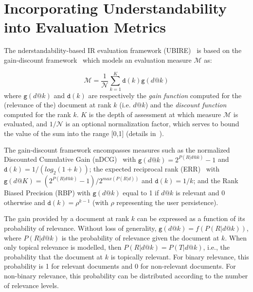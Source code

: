 \section{Incorporating Understandability into Evaluation Metrics}
\label{sec:understandability_metrics}
The nderstandability-based IR evaluation framework (UBIRE)~\cite{zuccon14,zuccon16} is based on the gain-discount framework~\cite{carterette11} which models an evaluation measure $\mathcal{M}$ as:




%
\begin{equation}
\mathcal{M} = \frac{1}{\mathcal{N}} \sum_{k=1}^{K} \mathtt{d}(k) \mathtt{g}(d@k)
\end{equation}
%
where $\mathtt{g}(d@k)$ and $\mathtt{d}(k)$ are respectively the \textit{gain function} computed for the (relevance of the) document at rank $k$ (i.e. $d@k$) and the \textit{discount function} computed for the rank $k$.
$K$ is the depth of assessment at which measure $\mathcal{M}$ is evaluated, and $1/\mathcal{N}$ is an optional normalization factor, which serves to bound the value of the sum into the range [0,1] (details in~\cite{carterette11}).

The gain-discount framework encompasses measures such as the normalized Discounted Cumulative Gain (nDCG)~\cite{jarvelin02} with $\mathtt{g}(d@k) = 2^{P(R|d@k)} - 1$ and $\mathtt{d}(k) = 1/(log_2(1 + k))$; the expected reciprocal rank (ERR)~\cite{chapelle09} with $\mathtt{g}(d@K) =  (2^{P (R|d@k)} - 1)/2^{max(P (R|d))}$ and $\mathtt{d}(k) = 1/k$; and the Rank Biased Precision (RBP) with $\mathtt{g}(d@k)$ equal to 1 if $d@k$ is relevant and 0 otherwise and $\mathtt{d}(k) = \rho^{k-1}$ (with $\rho$ representing the user persistence).

The gain provided by a document at rank $k$ can be expressed as a function of its probability of relevance. Without loss of generality, $\mathtt{g}(d@k) = f(P(R|d@k))$, where $P(R|d@k)$ is the probability of relevance given the document at $k$. 
When only topical relevance is modelled, then $P(R|d@k) = P(T|d@k)$, i.e., the probability that the document at $k$ is topically relevant. 
For binary relevance, this probability is 1 for relevant documents and 0 for non-relevant documents. For non-binary relevance, this probability can be distributed according to the number of relevance levels.

